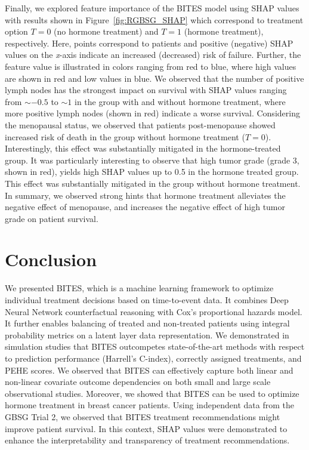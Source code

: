 \documentclass{article}
\begin{document}
	Finally, we explored feature importance of the BITES model using SHAP values \cite{Lundberg.2017} with results shown in Figure~\ref{fig:RGBSG_SHAP} which correspond to treatment option $T=0$ (no hormone treatment) and $T=1$ (hormone treatment), respectively. Here, points correspond to patients and positive (negative) SHAP values on the \textit{x}-axis indicate an increased (decreased) risk of failure. Further, the feature value is illustrated in colors ranging from red to blue, where high values are shown in red and low values in blue.
	We observed that the number of positive lymph nodes has the strongest impact on survival with SHAP values ranging from $\sim -0.5$ to $\sim 1$ in the group with and without hormone treatment, where more positive lymph nodes (shown in red) indicate a worse survival. Considering the menopausal status, we observed that patients post-menopause showed increased risk of death in the group without hormone treatment ($T=0$). Interestingly, this effect was substantially mitigated in the hormone-treated group. It was particularly interesting to observe that high tumor grade (grade 3, shown in red), yields high SHAP values up to 0.5 in the hormone treated group. This effect was substantially mitigated in the group without hormone treatment. In summary, we observed strong hints that hormone treatment alleviates the negative effect of menopause, and increases the negative effect of high tumor grade on patient survival.
	
	
	
	
	
	
	
	\section{Conclusion}
	We presented BITES, which is a machine learning framework to optimize individual treatment decisions based on time-to-event data. It combines Deep Neural Network counterfactual reasoning with Cox's proportional hazards model. It further enables balancing of treated and non-treated patients using integral probability metrics on a latent layer data representation. We demonstrated in simulation studies that BITES outcompetes state-of-the-art methods with respect to prediction performance (Harrell's C-index), correctly assigned treatments, and PEHE scores. We observed that BITES can effectively capture both linear and non-linear covariate outcome dependencies on both small and large scale observational studies.
	Moreover, we showed that BITES can be used to optimize hormone treatment in breast cancer patients. Using independent data from the GBSG Trial 2, we observed that BITES treatment recommendations might improve patient survival. In this context, SHAP values were demonstrated to enhance the interpretability and transparency of treatment recommendations.
	
\end{document}
